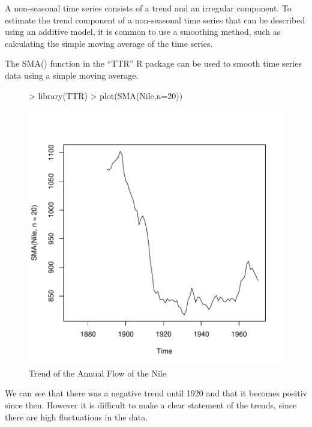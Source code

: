 \documentclass[11pt, a4paper]{article} %
\begin{document}
\noindent A non-seasonal time series consists of a trend and an irregular component. To estimate the trend component of a non-seasonal time series that can be described using an additive model, it is common to use a smoothing method, such as calculating the simple moving average of the time series.

\noindent The SMA() function in the “TTR” R package can be used to smooth time series data using a simple moving average. 
\begin{figure}[H]
\centering
\begin{Schunk}
\begin{Sinput}
> library(TTR)
> plot(SMA(Nile,n=20))
\end{Sinput}
\end{Schunk}
\includegraphics{sweaveclean-017}
\caption{Trend of the Annual Flow of the Nile}
\end{figure}

\noindent We can see that there was a negative trend until 1920 and that it becomes positiv since then. However it is difficult to make a clear statement of the trends, since there are high fluctuations in the data.
\end{document}
